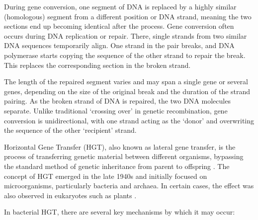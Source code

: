 During gene conversion, one segment of \ac{DNA} is replaced by a highly similar (homologous) segment from a different position or \ac{DNA} strand, meaning the two sections end up becoming identical after the process.
Gene conversion often occurs during \ac{DNA} replication or repair.
There, single strands from two similar \ac{DNA} sequences temporarily align.
One strand in the pair breaks, and \ac{DNA} polymerase starts copying the sequence of the other strand to repair the break.
This replaces the corresponding section in the broken strand.

The length of the repaired segment varies and may span a single gene or several genes, depending on the size of the original break and the duration of the strand pairing.
As the broken strand of \ac{DNA} is repaired, the two \ac{DNA} molecules separate.
Unlike traditional `crossing over' in genetic recombination, gene conversion is unidirectional, with one strand acting as the `donor' and overwriting the sequence of the other `recipient' strand.

Horizontal Gene Transfer (\ac{HGT}), also known as lateral gene transfer, is the process of transferring genetic material between different organisms,
bypassing the standard method of genetic inheritance from parent to offspring \cite{HGT_Soucy_2015} \cite{Gen_Molekbio_Schmidt_2023}.
The concept of \ac{HGT} emerged in the late 1940s and initially focused on microorganisms, particularly bacteria and archaea.
In certain cases, the effect was also observed in eukaryotes such as plants \cite{HGT_Eukaryotes_Keeling_2008}.

In bacterial \ac{HGT}, there are several key mechanisms by which it may occur:

